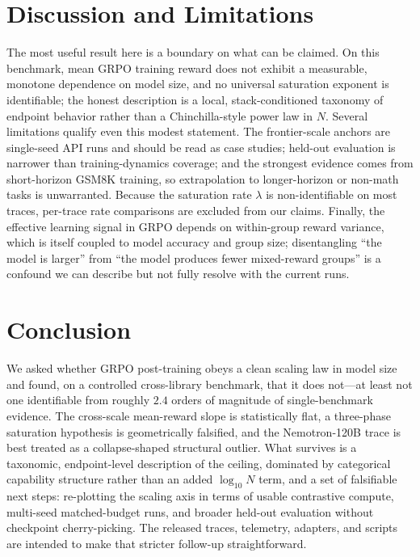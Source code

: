 \section{Discussion and Limitations}
\label{sec:p1-discussion}
The most useful result here is a boundary on what can be claimed. On this
benchmark, mean GRPO training reward does not exhibit a measurable, monotone dependence
on model size, and no universal saturation exponent is identifiable; the honest
description is a local, stack-conditioned taxonomy of endpoint behavior rather than a
Chinchilla-style power law in $N$. Several limitations qualify even this modest
statement. The frontier-scale anchors are single-seed API runs and should be read
as case studies; held-out evaluation is narrower than training-dynamics coverage;
and the strongest evidence comes from short-horizon GSM8K training, so extrapolation
to longer-horizon or non-math tasks is unwarranted. Because the saturation rate
$\lambda$ is non-identifiable on most traces, per-trace rate comparisons are
excluded from our claims. Finally, the effective learning signal in GRPO depends
on within-group reward variance, which is itself coupled to model accuracy and
group size; disentangling ``the model is larger'' from ``the model produces fewer
mixed-reward groups'' is a confound we can describe but not fully resolve with the
current runs.

\section{Conclusion}
\label{sec:p1-conclusion}
We asked whether GRPO post-training obeys a clean scaling law in model size and
found, on a controlled cross-library benchmark, that it does not---at least not
one identifiable from roughly $2.4$ orders of magnitude of single-benchmark evidence. The
cross-scale mean-reward slope is statistically flat, a three-phase saturation
hypothesis is geometrically falsified, and the Nemotron-120B trace is best treated
as a collapse-shaped structural outlier. What survives is a taxonomic, endpoint-level
description of the ceiling, dominated by categorical capability structure rather
than an added $\log_{10} N$ term, and a set of falsifiable next steps:
re-plotting the scaling axis in terms of usable contrastive compute, multi-seed
matched-budget runs, and broader held-out evaluation without checkpoint
cherry-picking. The released traces, telemetry, adapters, and scripts are intended to make
that stricter follow-up straightforward.

